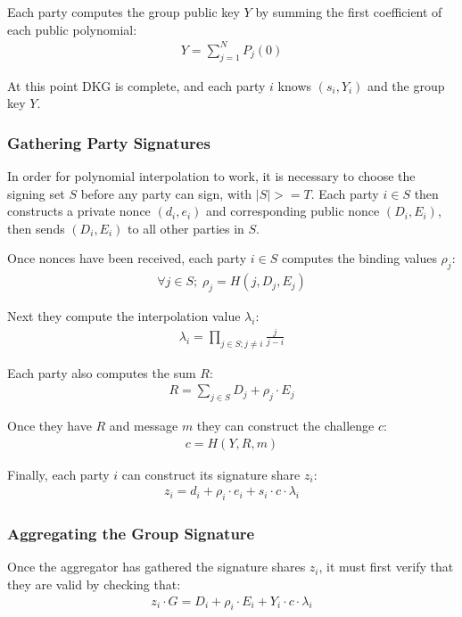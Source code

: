 \documentclass{article}
\begin{document}
Each party computes the group public key $Y$ by summing the first coefficient of each public polynomial:
\begin{align}
  Y = \sum_{j=1}^{N} P_j(0)
\end{align}

At this point DKG is complete, and each party $i$ knows $(s_i, Y_i)$ and the group key $Y$.

\newpage
\onecolumn
\subsubsection{
  Gathering Party Signatures
}

In order for polynomial interpolation to work, it is necessary to choose the signing set $S$ before any party can sign, with $|S| >= T$.  Each party $i \in S$ then constructs a private nonce $(d_i,e_i)$ and corresponding public nonce $(D_i,E_i)$, then sends $(D_i,E_i)$ to all other parties in $S$.

Once nonces have been received, each party $i \in S$ computes the binding values $\rho_j$:
\begin{align}
  \forall j \in S;\;\rho_j = H(j, D_j, E_j)
\end{align}

Next they compute the interpolation value $\lambda_i$:
\begin{align}
  \lambda_i = \prod_{j \in S; j \neq i}^{} \frac{j}{j - i}
\end{align}

Each party also computes the sum $R$:
\begin{align}
  R = \sum_{j \in S}^{} D_j + \rho_j \cdot E_j
\end{align}

Once they have $R$ and message $m$ they can construct the challenge $c$:
\begin{align}
  c = H(Y, R, m)
\end{align}

Finally, each party $i$ can construct its signature share $z_i$:
\begin{align}
  z_i = d_i + \rho_i \cdot e_i + s_i \cdot c \cdot \lambda_i
\end{align}


\subsubsection{
  Aggregating the Group Signature
}

Once the aggregator has gathered the signature shares $z_i$, it must first verify that they are valid by checking that:
\begin{align}
  z_i \cdot G = D_i + \rho_i \cdot E_i + Y_i \cdot c \cdot \lambda_i
\end{align}
\end{document}
